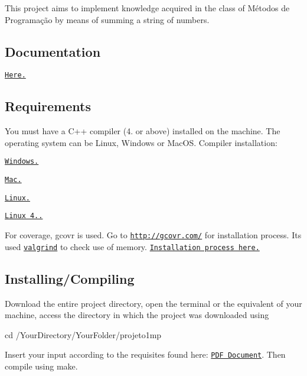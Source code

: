 This project aims to implement knowledge acquired in the class of Métodos de Programação by means of summing a string of numbers. \subsection*{Documentation}

\href{https://cdn.rawgit.com/alexandrebarbaruiva/projeto1mp/382482ae/html/md__r_e_a_d_m_e.html}{\tt Here.}

\subsection*{Requirements}

You must have a C++ compiler (4. or above) installed on the machine. The operating system can be Linux, Windows or Mac\+OS. Compiler installation\+:
\begin{DoxyItemize}
\item \href{https://cs.calvin.edu/courses/cs/112/resources/installingEclipse/cygwin/}{\tt Windows.}
\item \href{https://www.mkyong.com/mac/how-to-install-gcc-compiler-on-mac-os-x/}{\tt Mac.}
\item \href{https://askubuntu.com/questions/348654/how-to-install-g-compiler}{\tt Linux.}
\item \href{https://askubuntu.com/questions/428198/getting-installing-gcc-g-4-9-on-ubuntu}{\tt Linux 4..}
\end{DoxyItemize}

For coverage, gcovr is used. Go to \href{http://gcovr.com/}{\tt http\+://gcovr.\+com/} for installation process. It\textquotesingle{}s used \href{http://valgrind.org/}{\tt valgrind} to check use of memory. \href{http://valgrind.org/docs/manual/dist.install.html}{\tt Installation process here.}

\subsection*{Installing/\+Compiling}

Download the entire project directory, open the terminal or the equivalent of your machine, access the directory in which the project was downloaded using


\begin{DoxyCode}
cd /YourDirectory/YourFolder/projeto1mp
\end{DoxyCode}
 Insert your input according to the requisites found here\+: \href{mp_t1.pdf}{\tt P\+DF Document}. Then compile using make.


